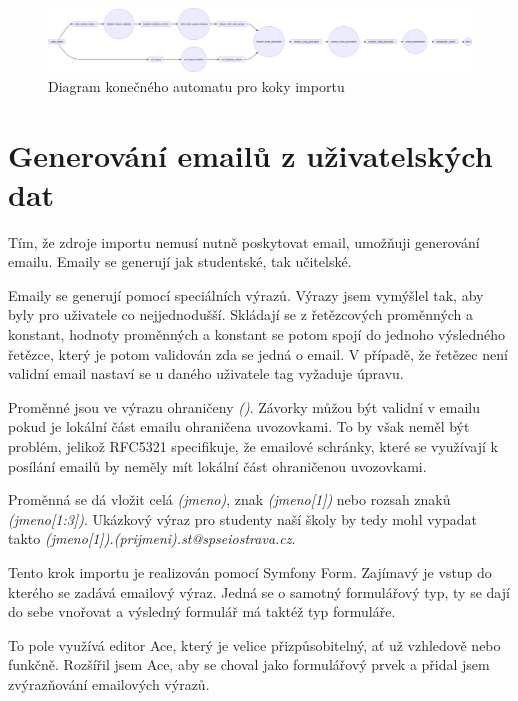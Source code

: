\clearpage

\begin{figure}
	\centering
  \includegraphics[width=1\linewidth]{Figures/import-diagram.png}
  \caption{Diagram konečného automatu pro koky importu}
  \label{postup:import-diagram}
\end{figure}

\clearpage

\section{Generování emailů z uživatelských dat}

Tím, že zdroje importu nemusí nutně poskytovat email, umožňuji generování emailu.
Emaily se generují jak studentské, tak učitelské.

Emaily se generují pomocí speciálních výrazů.
Výrazy jsem vymýšlel tak, aby byly pro uživatele co nejjednodušší.
Skládají se z řetězcových proměnných a konstant, hodnoty proměnných a konstant se potom spojí do jednoho výsledného řetězce, který je potom validován zda se jedná o email. V případě, že řetězec není validní email nastaví se u daného uživatele tag vyžaduje úpravu. 

Proměnné jsou ve výrazu ohraničeny \textit{()}. Závorky můžou být validní v emailu pokud je lokální část emailu ohraničena uvozovkami\cite{wiki-email-address}. To by však neměl být problém, jelikož RFC5321 specifikuje, že emailové schránky, které se využívají k posílání emailů by neměly mít lokální část ohraničenou uvozovkami\cite{rfc5321}.

Proměnná se dá vložit celá \textit{(jmeno)}, znak \textit{(jmeno[1])} nebo rozsah znaků \textit{(jmeno[1:3])}.
Ukázkový výraz pro studenty naší školy by tedy mohl vypadat takto \textit{(jmeno[1]).(prijmeni).st@spseiostrava.cz}.

Tento krok importu je realizován pomocí Symfony Form. Zajímavý je vstup do kterého se zadává emailový výraz. Jedná se o samotný formulářový typ, ty se dají do sebe vnořovat a výsledný formulář má taktéž typ formuláře. 

To pole využívá editor Ace, který je velice přizpůsobitelný, ať už vzhledově nebo funkčně. Rozšířil jsem Ace, aby se choval jako formulářový prvek a přidal jsem zvýrazňování emailových výrazů.

